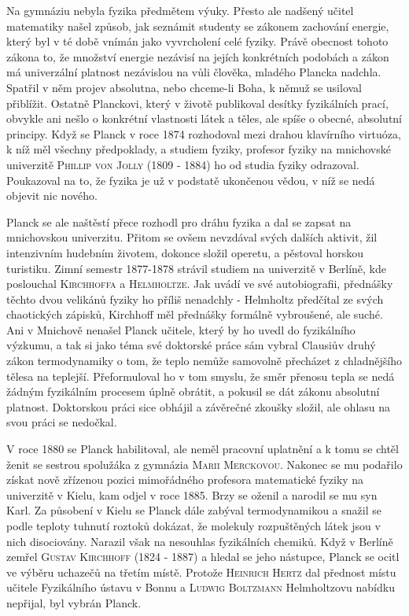         Na gymnáziu nebyla fyzika předmětem výuky. Přesto ale nadšený učitel matematiky našel
        způsob, jak seznámit studenty se zákonem zachování energie, který byl v té době vnímán jako
        vyvrcholení celé fyziky. Právě obecnost tohoto zákona to, že množství energie nezávisí na
        jejích konkrétních podobách a zákon má univerzální platnost nezávislou na vůli člověka,
        mladého Plancka nadchla. Spatřil v něm projev absolutna, nebo chceme-li Boha, k němuž se
        usiloval přiblížit. Ostatně Planckovi, který v životě publikoval desítky fyzikálních prací,
        obvykle ani nešlo o konkrétní vlastnosti látek a těles, ale spíše o obecné, absolutní
        principy. Když se Planck v roce 1874 rozhodoval mezi drahou klavírního virtuóza, k níž měl
        všechny předpoklady, a studiem fyziky, profesor fyziky na mnichovské univerzitě
        \textsc{Phillip von Jolly} (1809 - 1884) ho od studia fyziky odrazoval. Poukazoval na to, že
        fyzika je už v podstatě ukončenou vědou, v níž se nedá objevit nic nového.

        Planck se ale naštěstí přece rozhodl pro dráhu fyzika a dal se zapsat na mnichovskou
        univerzitu. Přitom se ovšem nevzdával svých dalších aktivit, žil intenzivním hudebním
        životem, dokonce složil operetu, a pěstoval horskou turistiku. Zimní semestr 1877-1878
        strávil studiem na univerzitě v Berlíně, kde poslouchal \textsc{Kirchhoffa} a
        \textsc{Helmholtze}. Jak uvádí ve své autobiografii, přednášky těchto dvou velikánů fyziky
        ho příliš nenadchly - Helmholtz předčítal ze svých chaotických zápisků, Kirchhoff měl
        přednášky formálně vybroušené, ale suché. Ani v Mnichově nenašel Planck učitele, který by ho
        uvedl do fyzikálního výzkumu, a tak si jako téma své doktorské práce sám vybral Clausiův
        druhý zákon termodynamiky o tom, že teplo nemůže samovolně přecházet z chladnějšího tělesa
        na teplejší. Přeformuloval ho v tom smyslu, že směr přenosu tepla se nedá žádným fyzikálním
        procesem úplně obrátit, a pokusil se dát zákonu absolutní platnost. Doktorskou práci sice
        obhájil a závěrečné zkoušky složil, ale ohlasu na svou práci se nedočkal.

        V roce 1880 se Planck habilitoval, ale neměl pracovní uplatnění a k tomu se chtěl ženit se
        sestrou spolužáka z gymnázia \textsc{Marii Merckovou}. Nakonec se mu podařilo získat nově
        zřízenou pozici mimořádného profesora matematické fyziky na univerzitě v Kielu, kam odjel v
        roce 1885. Brzy se oženil a narodil se mu syn Karl. Za působení v Kielu se Planck dále
        zabýval termodynamikou a snažil se podle teploty tuhnutí roztoků dokázat, že molekuly
        rozpuštěných látek jsou v nich disociovány. Narazil však na nesouhlas fyzikálních chemiků.
        Když v Berlíně zemřel \textsc{Gustav Kirchhoff} (1824 - 1887) a hledal se jeho nástupce,
        Planck se ocitl ve výběru uchazečů na třetím místě. Protože \textsc{Heinrich Hertz} dal
        přednost místu učitele Fyzikálního ústavu v Bonnu a \textsc{Ludwig Boltzmann} Helmholtzovu
        nabídku nepřijal, byl vybrán Planck.

